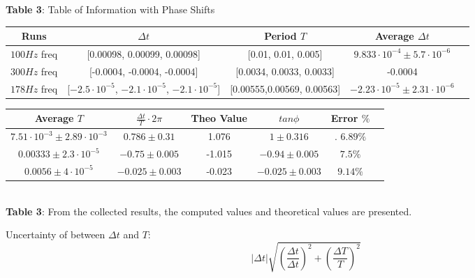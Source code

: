 \documentclass[11pt]{article}
\begin{document}
\begin{center}
\caption{\textbf{Table 3}: Table of Information with Phase Shifts} 
 \small\begin{tabular}{||c c c c c||} 
 \hline
 Runs & $\Delta t$ & Period $T$ & Average $\Delta t$ &\\ [0.5ex] 
 \hline\hline
 $100 Hz$ freq & [0.00098, 0.00099, 0.00098] & [0.01, 0.01, 0.005] & $9.833\cdot10^{-4}\pm 5.7 \cdot 10^{-6}$  &\\ 
 \hline
 $300 Hz$ freq  & [-0.0004, -0.0004, -0.0004] & [0.0034, 0.0033, 0.0033] & -0.0004  & \\
 \hline
 $178 Hz$ freq  & [$-2.5\cdot10^{-5}$, $-2.1\cdot10^{-5}$, $-2.1\cdot10^{-5}$] & [0.00555,0.00569, 0.00563] & $-2.23\cdot10^{-5}\pm 2.31\cdot10^{-6}$  &\\ [1ex] 
 \hline
\end{tabular}
 \small\begin{tabular}{||c c c c c c||} 
 \hline
 Average $T$ & $\frac{\Delta t}{T}\cdot 2\pi$  & Theo Value & $tan\phi$ & Error $\%$ &\\ [0.5ex] 
 \hline\hline
 $7.51\cdot 10^{-3}\pm 2.89\cdot10^{-3}$ & $0.786\pm 0.31$ & 1.076 & $1 \pm 0.316$ &. $6.89\%$&\\ 
 \hline
 $0.00333\pm 2.3\cdot10^{-5}$ & $-0.75\pm0.005$ & -1.015 & $-0.94\pm0.005$ & $7.5\%$ &\\
 \hline
 $0.0056\pm 4\cdot10^{-5}$ & $-0.025\pm0.003$ & -0.023 & $-0.025\pm 0.003$ & $9.14\%$ &\\ [1ex] 
 \hline
\end{tabular}
\\\textbf{Table 3}: From the collected results, the computed values and theoretical values are presented.
\end{center}
Uncertainty of between $\Delta t$ and $T$:
\[|\Delta t|\sqrt{(\frac{\Delta t}{\Delta t})^2+(\frac{\Delta T}{T})^2}\]
\end{document}
